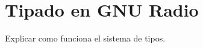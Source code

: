 \documentclass[../../main.tex]{subfiles}
\begin{document}
\graphicspath{{./figures}}
\chapter{Tipado en GNU Radio}\label{ap::tipado-gnu}

Explicar como funciona el sistema de tipos.
\end{document}
